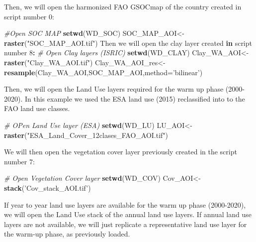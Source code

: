 \documentclass[
  10pt,
  b5paper,
]{book}
\newenvironment{Shaded}{\begin{snugshade}}{\end{snugshade}}
\newcommand{\CommentTok}[1]{\textcolor[rgb]{0.56,0.35,0.01}{\textit{#1}}}
\newcommand{\ControlFlowTok}[1]{\textcolor[rgb]{0.13,0.29,0.53}{\textbf{#1}}}
\newcommand{\DataTypeTok}[1]{\textcolor[rgb]{0.13,0.29,0.53}{#1}}
\newcommand{\DecValTok}[1]{\textcolor[rgb]{0.00,0.00,0.81}{#1}}
\newcommand{\KeywordTok}[1]{\textcolor[rgb]{0.13,0.29,0.53}{\textbf{#1}}}
\newcommand{\NormalTok}[1]{#1}
\newcommand{\OperatorTok}[1]{\textcolor[rgb]{0.81,0.36,0.00}{\textbf{#1}}}
\newcommand{\StringTok}[1]{\textcolor[rgb]{0.31,0.60,0.02}{#1}}
\begin{document}
Then, we will open the harmonized FAO GSOCmap of the country created in script number 0:

\begin{Shaded}
\begin{Highlighting}[]
\CommentTok{#Open SOC MAP }
\KeywordTok{setwd}\NormalTok{(WD_SOC)}
\NormalTok{SOC_MAP_AOI<-}\KeywordTok{raster}\NormalTok{(}\StringTok{"SOC_MAP_AOI.tif"}\NormalTok{)}
\NormalTok{Then we will open the clay layer created }\ControlFlowTok{in}\NormalTok{ script number }\DecValTok{8}\OperatorTok{:}
\StringTok{ }\CommentTok{# Open Clay layers  (ISRIC)}
\KeywordTok{setwd}\NormalTok{(WD_CLAY)}
\NormalTok{Clay_WA_AOI<-}\KeywordTok{raster}\NormalTok{(}\StringTok{"Clay_WA_AOI.tif"}\NormalTok{)}
\NormalTok{Clay_WA_AOI_res<-}\KeywordTok{resample}\NormalTok{(Clay_WA_AOI,SOC_MAP_AOI,}\DataTypeTok{method=}\StringTok{'bilinear'}\NormalTok{) }
\end{Highlighting}
\end{Shaded}

Then, we will open the Land Use layers required for the warm up phase (2000-2020). In this example we used the ESA land use (2015) reclassified into to the FAO land use classes.

\begin{Shaded}
\begin{Highlighting}[]
\CommentTok{# OPen Land Use layer (ESA)}
\KeywordTok{setwd}\NormalTok{(WD_LU)}
\NormalTok{LU_AOI<-}\KeywordTok{raster}\NormalTok{(}\StringTok{"ESA_Land_Cover_12clases_FAO_AOI.tif"}\NormalTok{)}
\end{Highlighting}
\end{Shaded}

We will then open the vegetation cover layer previously created in the script number 7:

\begin{Shaded}
\begin{Highlighting}[]
\CommentTok{# Open Vegetation Cover layer }
\KeywordTok{setwd}\NormalTok{(WD_COV)}
\NormalTok{Cov_AOI<-}\KeywordTok{stack}\NormalTok{(}\StringTok{'Cov_stack_AOI.tif'}\NormalTok{)}
\end{Highlighting}
\end{Shaded}

If year to year land use layers are available for the warm up phase (2000-2020), we will open the Land Use stack of the annual land use layers. If annual land use layers are not available, we will just replicate a representative land use layer for the warm-up phase, as previously loaded.
\end{document}
